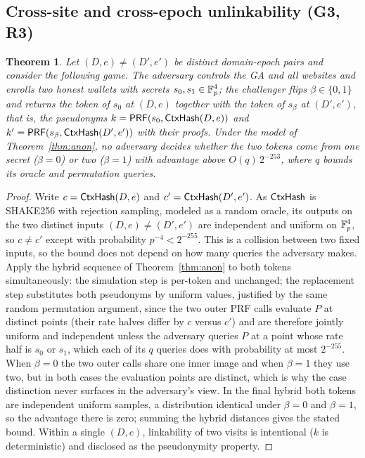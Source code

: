 \documentclass[11pt]{article}
\newtheorem{theorem}{Theorem}
\theoremstyle{definition}
\begin{document}
\subsection{Cross-site and cross-epoch unlinkability (G3, R3)}

\begin{theorem}
\label{thm:unlink}
Let $(D, e) \ne (D', e')$ be distinct domain-epoch pairs and consider the following game.
The adversary controls the GA and all websites and enrolls two honest wallets with secrets
$s_0, s_1 \in \mathbb{F}_p^4$; the challenger flips $\beta \in \{0,1\}$ and returns the token of
$s_0$ at $(D, e)$ together with the token of $s_\beta$ at $(D', e')$, that is, the
pseudonyms $k = \mathsf{PRF}(s_0, \mathsf{CtxHash}(D, e))$ and $k' = \mathsf{PRF}(s_\beta, \mathsf{CtxHash}(D', e'))$ with
their proofs. Under the model of Theorem~\ref{thm:anon}, no adversary decides whether the
two tokens come from one secret ($\beta = 0$) or two ($\beta = 1$) with advantage above
$O(q)\,2^{-253}$, where $q$ bounds its oracle and permutation queries.
\end{theorem}

\begin{proof}
Write $c = \mathsf{CtxHash}(D, e)$ and $c' = \mathsf{CtxHash}(D', e')$. As $\mathsf{CtxHash}$ is SHAKE256 with
rejection sampling, modeled as a random oracle, its outputs on the two distinct inputs
$(D, e) \ne (D', e')$ are independent and uniform on $\mathbb{F}_p^4$, so $c \ne c'$ except with
probability $p^{-4} < 2^{-255}$. This is a collision between two fixed inputs, so the
bound does not depend on how many queries the adversary makes. Apply the hybrid sequence of
Theorem~\ref{thm:anon} to both tokens simultaneously: the simulation step is per-token and
unchanged; the replacement step substitutes both pseudonyms by uniform values, justified
by the same random permutation argument, since the two outer PRF calls evaluate $P$ at
distinct points (their rate halves differ by $c$ versus $c'$) and are therefore jointly
uniform and independent unless the adversary queries $P$ at a point whose rate half is
$s_0$ or $s_1$, which each of its $q$ queries does with probability at most $2^{-255}$.
When $\beta = 0$ the two outer calls share one inner image and when $\beta = 1$ they use
two, but in both cases the evaluation points are distinct, which is why the case
distinction never surfaces in the adversary's view. In the
final hybrid both tokens are independent uniform samples, a distribution identical under
$\beta = 0$ and $\beta = 1$, so the advantage there is zero; summing the hybrid distances
gives the stated bound. Within a single $(D, e)$, linkability of two visits is intentional
($k$ is deterministic) and disclosed as the pseudonymity property.
\end{proof}
\end{document}
